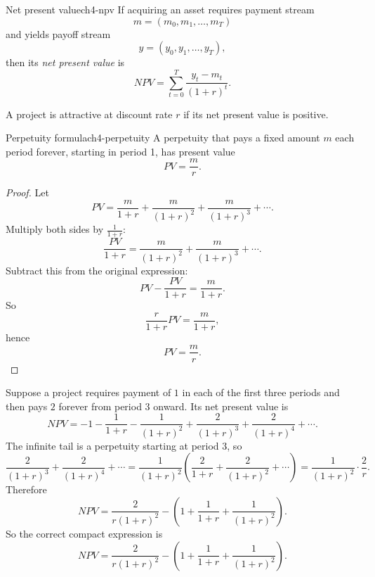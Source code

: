 \begin{definition}{Net present value}{ch4-npv}
If acquiring an asset requires payment stream
\[
m=(m_0,m_1,\dots,m_T)
\]
and yields payoff stream
\[
y=(y_0,y_1,\dots,y_T),
\]
then its \emph{net present value} is
\[
NPV=\sum_{t=0}^{T}\frac{y_t-m_t}{(1+r)^t}.
\]
\end{definition}

A project is attractive at discount rate $r$ if its net present value is positive.

\begin{theorem}{Perpetuity formula}{ch4-perpetuity}
A perpetuity that pays a fixed amount $m$ each period forever, starting in period 1, has present value
\[
PV = \frac{m}{r}.
\]
\end{theorem}

\begin{proof}
Let
\[
PV=\frac{m}{1+r}+\frac{m}{(1+r)^2}+\frac{m}{(1+r)^3}+\cdots.
\]
Multiply both sides by $\frac{1}{1+r}$:
\[
\frac{PV}{1+r}
=
\frac{m}{(1+r)^2}+\frac{m}{(1+r)^3}+\cdots.
\]
Subtract this from the original expression:
\[
PV-\frac{PV}{1+r}=\frac{m}{1+r}.
\]
So
\[
\frac{r}{1+r}PV=\frac{m}{1+r},
\]
hence
\[
PV=\frac{m}{r}.
\]
\end{proof}

\begin{examplebox}[title={Worked Example: net present value of a delayed perpetuity project}]
Suppose a project requires payment of $1$ in each of the first three periods and then pays $2$ forever from period 3 onward. Its net present value is
\[
NPV
=
-1-\frac{1}{1+r}-\frac{1}{(1+r)^2}
+\frac{2}{(1+r)^3}+\frac{2}{(1+r)^4}+\cdots.
\]
The infinite tail is a perpetuity starting at period 3, so
\[
\frac{2}{(1+r)^3}+\frac{2}{(1+r)^4}+\cdots
=
\frac{1}{(1+r)^2}\left(\frac{2}{1+r}+\frac{2}{(1+r)^2}+\cdots\right)
=
\frac{1}{(1+r)^2}\cdot \frac{2}{r}.
\]
Therefore
\[
NPV
=
\frac{2}{r(1+r)^2}
-
\left(
1+\frac{1}{1+r}+\frac{1}{(1+r)^2}
\right).
\]
So the correct compact expression is
\[
\boxed{
NPV
=
\frac{2}{r(1+r)^2}
-
\left(
1+\frac{1}{1+r}+\frac{1}{(1+r)^2}
\right).
}
\]
\end{examplebox}

